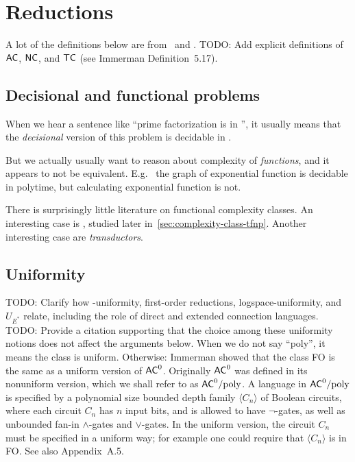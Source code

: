 \chapter{Reductions}
\label{chap:reductions}
A lot of the definitions below are from~\cite{10.5555/520668} and \cite{Immerman1999-IMMDC}.
TODO: Add explicit definitions of $\mathsf{AC}$, $\mathsf{NC}$, and $\mathsf{TC}$ (see Immerman Definition~5.17).


\section{Decisional and functional problems}
When we hear a sentence like ``prime factorization is in '', it usually
means that the \emph{decisional} version of this problem is decidable in .

But we actually usually want to reason about complexity of \emph{functions},
and it appears to not be equivalent. E.g. \ the graph of exponential function is 
decidable in polytime, but calculating exponential function is not.

There is surprisingly little literature on functional complexity classes.
An interesting case is , studied later in~\ref{sec:complexity-class-tfnp}.
Another interesting case are \emph{transductors}.

\section{Uniformity}
TODO: Clarify how -uniformity, first-order reductions, logspace-uniformity, and $U_{E^*}$ relate, including the role of direct and extended connection languages.
TODO: Provide a citation supporting that the choice among these uniformity notions does not affect the arguments below.
When we do not say ``poly'', it means the class is uniform. Otherwise: Immerman showed that the class FO is the same as a uniform version
of $\mathsf{AC}^{0}$. Originally $\mathsf{AC}^{0}$ was defined in its nonuniform version, which
we shall refer to as $\mathsf{AC}^{0}/\text{poly}$. A language in $\mathsf{AC}^{0}/\text{poly}$ is specified by
a polynomial size bounded depth family $\langle C_n \rangle$ of Boolean circuits, where
each circuit $C_n$ has $n$ input bits, and is allowed to have $\neg$-gates, as well as
unbounded fan-in $\land$-gates and $\lor$-gates. In the uniform version, the circuit
$C_n$ must be specified in a uniform way; for example one could require that
$\langle C_n \rangle$ is in FO\@. See also Appendix~A.5.

